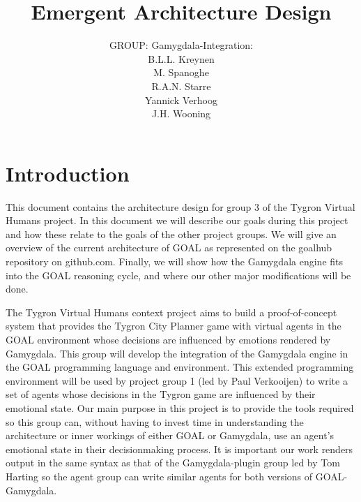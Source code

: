 \documentclass[]{article}
\title{Emergent Architecture Design}
\author{GROUP: Gamygdala-Integration:\\
	B.L.L. Kreynen\\
	M. Spanoghe\\
	R.A.N. Starre\\
	Yannick Verhoog\\
	J.H. Wooning\\
	}
\begin{document}
\maketitle
\pagebreak
\tableofcontents
\pagebreak
\section{Introduction}
This document contains the architecture design for group 3 of the Tygron Virtual Humans project. In this document we will describe our goals during this project and how these relate to the goals of the other project groups. We will give an overview of the current architecture of GOAL as represented on the goalhub repository on github.com. Finally, we will show how the Gamygdala engine fits into the GOAL reasoning cycle, and where our other major modifications will be done.

The Tygron Virtual Humans context project aims to build a proof-of-concept system that provides the \gls{Tygron City Planner} game with virtual agents in the GOAL environment whose decisions are influenced by emotions rendered by Gamygdala. This group will develop the integration of the \gls{Gamygdala} engine in the \gls{GOAL} programming language and environment. This extended programming environment will be used by project group 1 (led by Paul Verkooijen) to write a set of agents whose decisions in the Tygron game are influenced by their emotional state. Our main purpose in this project is to provide the tools required so this group can, without having to invest time in understanding the architecture or inner workings of either GOAL or Gamygdala, use an agent's emotional state in their decisionmaking process. It is important our work renders output in the same syntax as that of the Gamygdala-plugin group led by Tom Harting so the agent group can write similar agents for both versions of GOAL-Gamygdala.
\newpage
\end{document}

